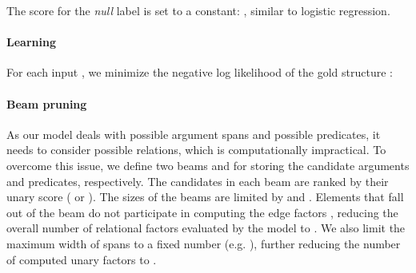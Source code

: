 \documentclass[11pt,a4paper]{article}
\newcommand\layerbox[4]{
\draw[rounded corners] (#2, #3) rectangle (#2 + #1 * #4, #3 + #1 * 1);
}
\newcommand\layercolorbox[5][0.4] {
\draw[rounded corners, fill=#5] (#2, #3) rectangle (#2 + #1 * #4, #3 + #1 * 1);
}
\newcommand\layercomponent[5]{
\filldraw[fill=#5] (#2 + #1 * #4 - #1 * 0.5, #3 + #1 * 0.5) circle (#1 * 0.4);
}
\newcommand\layer[5][0.4] {
\layerbox{#1}{#2}{#3}{#4}
\foreach \x in {1, ..., #4}{
  \layercomponent{#1}{#2}{#3}{\x}{#5}
}
}
\newcommand\sumnode[3] {
\layercolorbox{#1-0.2}{#2-0.2}{1}{#3}
\node at (#1, #2) {\textcolor{white}{+}};
}
\begin{document}
The score for the \textit{null} label is set to a constant:
, similar to  logistic regression.

\paragraph{Learning}
For each input , we minimize the negative log likelihood of the gold structure :


\paragraph{Beam pruning}
As our model deals with  possible argument spans and  possible predicates, it needs to consider  possible relations, which is computationally impractical. To overcome this issue, we define two beams  and  for storing the candidate arguments and predicates, respectively. The candidates in each beam are ranked by their unary score ( or ). The sizes of the beams are limited by  and . Elements that fall out of the beam do not participate in computing the edge factors , reducing the overall number of relational factors evaluated by the model to  .
We also limit the maximum width of spans to a fixed number  (e.g. ), further reducing the number of computed unary factors to . 

 \newcommand\lstmnode[2] {
\filldraw[fill=g-yellow] (#1+0.2,#2+0.3) rectangle (#1+0.6,#2+0.7); }

\newcommand\forwardlstmconnect[3] {
\draw[-latex, line width=1pt] (#1+0.6,#2+0.25+0.7) -- (#1-0.3+#3,#2+0.25+0.7);
}
\newcommand\backwardlstmconnect[3] {
\draw[-latex, line width=1pt] (#1-0.3+#3,#2+0.25+0.7) -- (#1+0.6,#2+0.25+0.7);
}
\newcommand\lstmconnect[3] {
\forwardlstmconnect{#1}{#2+0.35}{#3}
\backwardlstmconnect{#1}{#2 + 1.15}{#3}
}

\newcommand\spanout[4] {
\node[anchor=north, align=center] at (#1+0.6, 5.6) {}; \layer{#1}{4.6}{3}{g-green} \draw[-latex, line width=1pt, out=90, in=-90] (1.5 * #2 +0.4, 3.1) to (#1+0.2, 4.6); \draw[-latex, line width=1pt, out=90, in=-90] (1.5 * #3 + 0.4, 3.1) to (#1+1, 4.6); \sumnode{#1 + 0.6}{4.1}{g-red}
\foreach \x in {#2, ..., #3}{
\draw[-latex, line width=1pt, in=-90, out=90, looseness=1] (1.5 * \x + 0.4, 3.1) to (#1+0.6, 3.9); }
\draw[-latex, line width=1pt, in=-90, out=90, looseness=1] (#1+0.6, 4.3) to (#1+0.6, 4.6); }

\newcommand\mentionout[4] {
\node[anchor=north, align=center] at (#1+0.6, 7.2) {}; \layer{#1}{4.6}{3}{g-green} \layer{#1+0.4}{6.3}{1}{black} \draw[-latex, line width=1pt] (#1+0.6, 5) to (#1+0.6, 6.3); 

\draw[-latex, line width=1pt, out=90, in=-90] (1.5 * #2 +0.4, 3.1) to (#1+0.2, 4.6); 

\draw[-latex, line width=1pt, out=90, in=-90] (1.5 * #3 + 0.4, 3.1) to (#1+1, 4.6); 

\sumnode{#1 + 0.6}{4.1}{g-red}

\foreach \x in {#2, ..., #3}{
\draw[-latex, line width=1pt, in=-90, out=90, looseness=1] (1.5 * \x + 0.4, 3.1) to (#1+0.6, 3.9); }
\draw[-latex, line width=1pt, in=-90, out=90] (#1+0.6, 4.3) to (#1+0.6, 4.6); }
\end{document}

